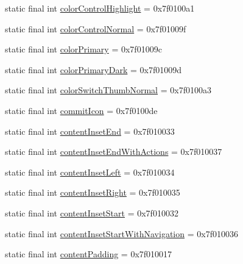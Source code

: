 \begin{CompactItemize}
static final int \hyperlink{classandroid_1_1support_1_1v7_1_1mediarouter_1_1_r_1_1attr_11a081f0c412004bb234c86d329d7f74}{colorControlHighlight} = 0x7f0100a1
\item 
static final int \hyperlink{classandroid_1_1support_1_1v7_1_1mediarouter_1_1_r_1_1attr_e253b7303a0631cf38fcf9fe61d5f030}{colorControlNormal} = 0x7f01009f
\item 
static final int \hyperlink{classandroid_1_1support_1_1v7_1_1mediarouter_1_1_r_1_1attr_475833c84dc1f1160fa8bd7b13a456ad}{colorPrimary} = 0x7f01009c
\item 
static final int \hyperlink{classandroid_1_1support_1_1v7_1_1mediarouter_1_1_r_1_1attr_787d2ecf0db0ca232fd75aab3d655ea0}{colorPrimaryDark} = 0x7f01009d
\item 
static final int \hyperlink{classandroid_1_1support_1_1v7_1_1mediarouter_1_1_r_1_1attr_8e421cab8dcff2cae574cf21eb47fb66}{colorSwitchThumbNormal} = 0x7f0100a3
\item 
static final int \hyperlink{classandroid_1_1support_1_1v7_1_1mediarouter_1_1_r_1_1attr_45396c5983715ea1141ca8673682b4dc}{commitIcon} = 0x7f0100de
\item 
static final int \hyperlink{classandroid_1_1support_1_1v7_1_1mediarouter_1_1_r_1_1attr_7d11627b7513d9c320adedea6364a207}{contentInsetEnd} = 0x7f010033
\item 
static final int \hyperlink{classandroid_1_1support_1_1v7_1_1mediarouter_1_1_r_1_1attr_5e8dee28a8391e767f76e87a6f561bc3}{contentInsetEndWithActions} = 0x7f010037
\item 
static final int \hyperlink{classandroid_1_1support_1_1v7_1_1mediarouter_1_1_r_1_1attr_94e5d40f2f7b9bbccf8b0e91d2a5e53f}{contentInsetLeft} = 0x7f010034
\item 
static final int \hyperlink{classandroid_1_1support_1_1v7_1_1mediarouter_1_1_r_1_1attr_85c4ba124ba2d0aec830c009d2e7b075}{contentInsetRight} = 0x7f010035
\item 
static final int \hyperlink{classandroid_1_1support_1_1v7_1_1mediarouter_1_1_r_1_1attr_fba41e0d22296c6268875fa4a6af5974}{contentInsetStart} = 0x7f010032
\item 
static final int \hyperlink{classandroid_1_1support_1_1v7_1_1mediarouter_1_1_r_1_1attr_cec2f29fcfbfd10d16cec0e8162713d5}{contentInsetStartWithNavigation} = 0x7f010036
\item 
static final int \hyperlink{classandroid_1_1support_1_1v7_1_1mediarouter_1_1_r_1_1attr_07cda81a185a74463542ca95a9d42bf4}{contentPadding} = 0x7f010017
\item 

\end{CompactItemize}
